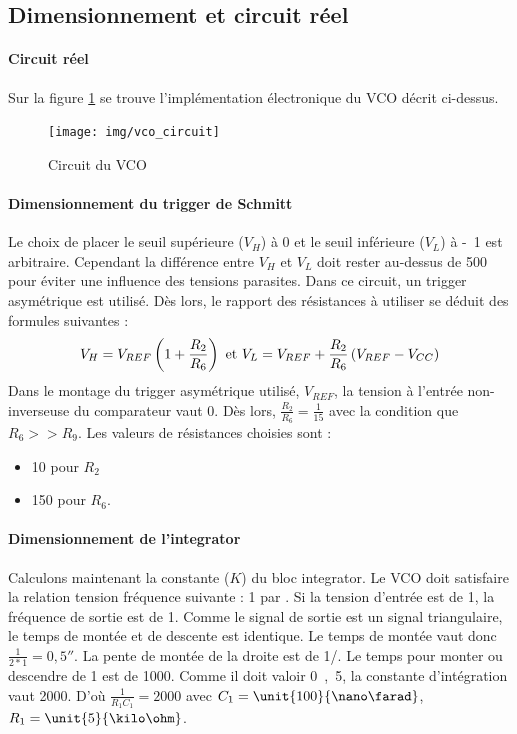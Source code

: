 \subsection{Dimensionnement et circuit réel}
\paragraph{Circuit réel}
Sur la figure \ref{fig:circuit_vco} se trouve l'implémentation électronique du VCO décrit ci-dessus.
\begin{figure}[ht]
\centering
\texttt{[image: img/vco\_circuit]}
\caption{Circuit du VCO}
\label{fig:circuit_vco}
\end{figure}
\paragraph{Dimensionnement du trigger de Schmitt}
Le choix de placer le seuil supérieure ($V_H$) à \unit{0}{\volt} et le seuil inférieure ($V_L$) à \unit{-1}{\volt} est arbitraire. Cependant la différence entre $V_H$ et $V_L$ doit rester au-dessus de \unit{500}{\milli\volt} pour éviter une influence des tensions parasites. Dans ce circuit, un trigger asymétrique est utilisé. Dès lors, le rapport des résistances à utiliser se déduit des formules suivantes : 
$$V_H=V_{REF}\left(1+\frac{R_2}{R_6}\right) \textmd{ et } V_L=V_{REF} + \frac{R_2}{R_6}\left(V_{REF}-V_{CC}\right)$$
Dans le montage du trigger asymétrique utilisé, $V_{REF}$, la tension à l'entrée non-inverseuse du comparateur vaut \unit{0}{\volt}. Dès lors, $\frac{R_2}{R_6}=\frac{1}{15}$
avec la condition que $R_6>>R_9$. Les valeurs de résistances choisies sont :
\begin{itemize}
\item \unit{10}{\kilo\ohm} pour $R_2$
\item \unit{150}{\kilo\ohm} pour $R_6$.
\end{itemize}

\paragraph{Dimensionnement de l'integrator}
Calculons maintenant la constante ($K$) du bloc integrator. Le VCO doit satisfaire la relation tension fréquence suivante : \unit{1}{\milli\volt} par \unit{}{\hertz}. Si la tension d'entrée est de \unit{1}{\milli\volt}, la fréquence de sortie est de \unit{1}{\hertz}. Comme le signal de sortie est un signal triangulaire, le temps de montée et de descente est identique. Le temps de montée vaut donc $\frac{1}{2*1} =  \unit{0,5}{\second}$. La pente de montée de la droite est de \unit{1}{\milli\volt}/\unit{}{\second}. Le temps pour monter ou descendre de \unit{1}{\volt} est de \unit{1000}{\second}. Comme il doit valoir \unit{0,5}{\second}, la constante d'intégration vaut 2000. D'où $\frac{1}{R_1C_1}=2000$ avec $C_1= \unit{100}{\nano\farad}$, $R_1 = \unit{5}{\kilo\ohm}$.
